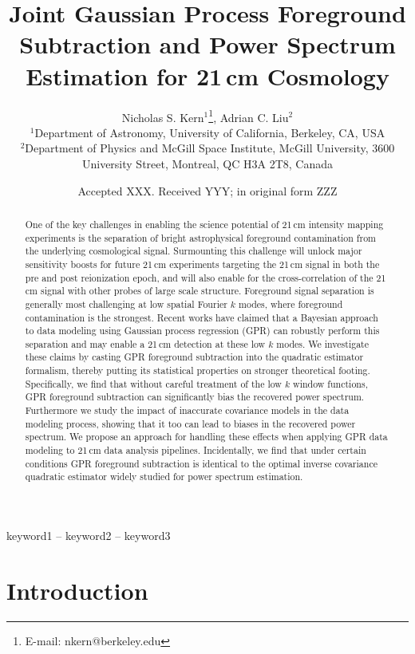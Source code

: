 \documentclass[a4paper,fleqn,usenatbib]{mnras}
\title[Joint Gaussian Process Foreground Subtraction and Power Spectrum Estimation]
{Joint Gaussian Process Foreground Subtraction and Power Spectrum Estimation for 21\,cm Cosmology}
\author[N. S. Kern \& A. C. Liu]{
Nicholas S. Kern$^{1}$\thanks{E-mail: nkern@berkeley.edu},
Adrian C. Liu$^{2}$
\\
$^{1}$Department of Astronomy, University of California, Berkeley, CA, USA\\
$^{2}$Department of Physics and McGill Space Institute, McGill University, 3600 University Street, Montreal, QC H3A 2T8, Canada
}
\date{Accepted XXX. Received YYY; in original form ZZZ}
\begin{document}
\label{firstpage}
\pagerange{\pageref{firstpage}--\pageref{lastpage}}
\maketitle

\begin{abstract}
One of the key challenges in enabling the science potential of 21\,cm intensity mapping experiments is the separation of bright astrophysical foreground contamination from the underlying cosmological signal.
Surmounting this challenge will unlock major sensitivity boosts for future 21\,cm experiments targeting the 21\,cm signal in both the pre and post reionization epoch, and will also enable for the cross-correlation of the 21\,cm signal with other probes of large scale structure.
Foreground signal separation is generally most challenging at low spatial Fourier $k$ modes, where foreground contamination is the strongest.
Recent works have claimed that a Bayesian approach to data modeling using Gaussian process regression (GPR) can robustly perform this separation and may enable a 21\,cm detection at these low $k$ modes.
We investigate these claims by casting GPR foreground subtraction into the quadratic estimator formalism, thereby putting its statistical properties on stronger theoretical footing.
Specifically, we find that without careful treatment of the low $k$ window functions, GPR foreground subtraction can significantly bias the recovered power spectrum.
Furthermore we study the impact of inaccurate covariance models in the data modeling process, showing that it too can lead to biases in the recovered power spectrum.
We propose an approach for handling these effects when applying GPR data modeling to 21\,cm data analysis pipelines.
Incidentally, we find that under certain conditions GPR foreground subtraction is identical to the optimal inverse covariance quadratic estimator widely studied for power spectrum estimation.
\end{abstract}

\begin{keywords}
keyword1 -- keyword2 -- keyword3
\end{keywords}



\section{Introduction}
\label{sec:intro}
\end{document}
